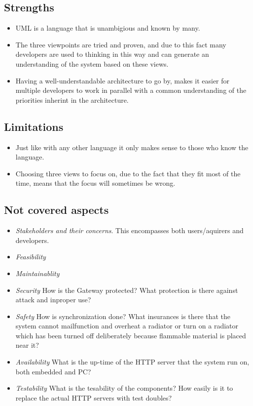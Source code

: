 \documentclass[a4paper,10pt]{article}
\begin{document}
\subsection{Strengths}
\begin{itemize}
\item UML is a language that is unambigious and known by many.
\item The three viewpoints are tried and proven, and due to this fact many developers are used to thinking in this way and can generate an understanding of the system based on these views.
 \item Having a well-understandable architecture to go by, makes it easier for multiple developers to work in parallel with a common understanding of the priorities inherint in the architecture.
\end{itemize}

\subsection{Limitations}
\begin{itemize}
\item Just like with any other language it only makes sense to those who know the language. 
\item Choosing three views to focus on, due to the fact that they fit most of the time, means that the focus will sometimes be wrong.
\end{itemize}

\subsection{Not covered aspects}
\begin{itemize}
\item \emph{Stakeholders and their concerns}. This encompasses both users/aquirers and developers.
\item \emph{Feasibility}
\item \emph{Maintainablity}
\item \emph{Security} How is the Gateway protected? What protection is there against attack and inproper use? 
\item \emph {Safety} How is synchronization done? What insurances is there that the system cannot mailfunction and overheat a radiator or turn on a radiator which has been turned off deliberately because flammable material is placed near it?
\item \emph{Availability} What is the up-time of the HTTP server that the system run on, both embedded and PC?
\item \emph{Testability} What is the tesability of the components? How easily is it to replace the actual HTTP servers with test doubles?
\end{itemize}
\end{document}
